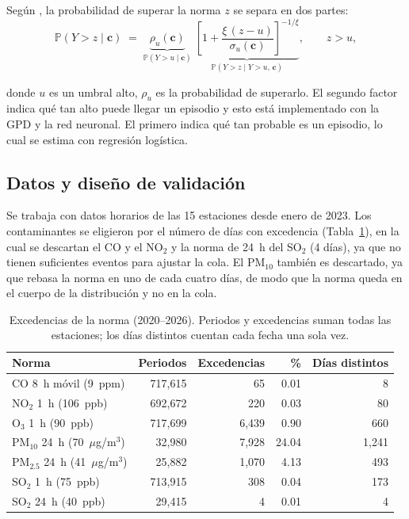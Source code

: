 \documentclass[11pt]{article}
\begin{document}
Según \citet{gyarmati2017}, la probabilidad de superar la norma $z$ se separa en dos partes: 
\begin{equation}
    \mathbb{P}(Y > z \mid \mathbf{c}) \;=\; \underbrace{\rho_u(\mathbf{c})}_{\mathbb{P}(Y>u \mid \mathbf{c})}\;\underbrace{\left[1+\frac{\xi\,(z-u)}{\sigma_u(\mathbf{c})}\right]^{-1/\xi}}_{\mathbb{P}(Y>z \mid Y>u,\,\mathbf{c})}, \qquad z > u,
    \label{eq:total}
\end{equation}

donde $u$ es un umbral alto, $\rho_u$  es la probabilidad de superarlo. El segundo factor indica qué tan alto puede llegar un episodio y esto está implementado con la GPD y la red neuronal. El primero indica qué tan probable es un episodio, lo cual se estima con regresión logística. 

\subsection{Datos y diseño de validación}
Se trabaja con datos horarios de las 15 estaciones desde enero de 2023. Los contaminantes se eligieron por el número de días con excedencia (Tabla~\ref{tab:excedencias}), en la cual se descartan el CO y el NO$_2$ y la norma de 24~h del SO$_2$ (4 días), ya que no tienen suficientes eventos para ajustar la cola. El PM$_{10}$ también es descartado, ya que rebasa la norma en uno de cada cuatro días, de modo que la norma queda en el cuerpo de la distribución y no en la cola. 

\begin{table}[H]
\centering
\small
\caption{Excedencias de la norma (2020--2026). Periodos y excedencias suman todas las estaciones; los días distintos cuentan cada fecha una sola vez.}
\vspace{5pt}
\label{tab:excedencias}
\begin{tabular}{lrrrr}
\toprule
\textbf{Norma} & \textbf{Periodos} & \textbf{Excedencias} & \textbf{\%} & \textbf{Días distintos} \\
\midrule
CO 8~h móvil (9~ppm)              & 717{,}615 & 65      & 0.01  & 8       \\
NO$_2$ 1~h (106~ppb)              & 692{,}672 & 220     & 0.03  & 80      \\
O$_3$ 1~h (90~ppb)                & 717{,}699 & 6{,}439 & 0.90  & 660     \\
PM$_{10}$ 24~h (70~$\mu$g/m$^3$)  & 32{,}980  & 7{,}928 & 24.04 & 1{,}241 \\
PM$_{2.5}$ 24~h (41~$\mu$g/m$^3$) & 25{,}882  & 1{,}070 & 4.13  & 493     \\
SO$_2$ 1~h (75~ppb)               & 713{,}915 & 308     & 0.04  & 173     \\
SO$_2$ 24~h (40~ppb)              & 29{,}415  & 4       & 0.01  & 4       \\
\bottomrule
\end{tabular}
\end{table}
\end{document}
